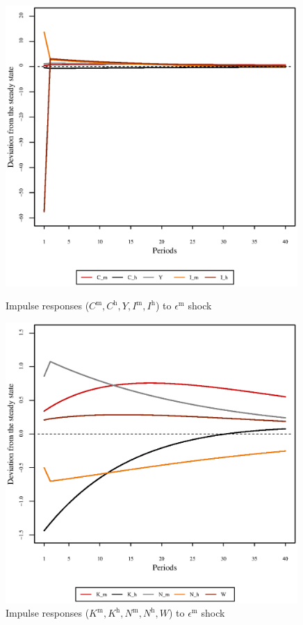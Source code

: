 \begin{figure}[h]
\begin{minipage}{0.5\textwidth}
\vspace*{-3em}
\centering
\includegraphics[width=0.99\textwidth, scale=0.55]{plots/plot_3.eps}
\caption{Impulse responses ($C^{\mathrm{m}}, C^{\mathrm{h}}, Y, I^{\mathrm{m}}, I^{\mathrm{h}}$) to $\epsilon^{\mathrm{m}}$ shock}
\end{minipage}
\begin{minipage}{0.5\textwidth}
\vspace*{-3em}
\centering
\includegraphics[width=0.99\textwidth, scale=0.55]{plots/plot_4.eps}
\caption{Impulse responses ($K^{\mathrm{m}}, K^{\mathrm{h}}, N^{\mathrm{m}}, N^{\mathrm{h}}, W$) to $\epsilon^{\mathrm{m}}$ shock}
\end{minipage}
\end{figure}

\pagebreak


